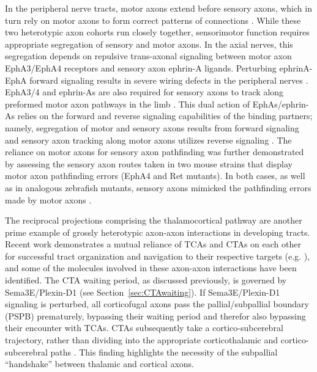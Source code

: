 In the peripheral nerve tracts, motor axons extend before sensory axons, which in turn rely on motor axons to form correct patterns of connections \cite{wang2013axons}.
While these two heterotypic axon cohorts run closely together, sensorimotor function requires appropriate segregation of sensory and motor axons.
In the axial nerves, this segregation depends on repulsive trans-axonal signaling between motor axon EphA3/EphA4 receptors and sensory axon ephrin-A ligands.
Perturbing ephrinA-EphA forward signaling results in severe wiring defects in the peripheral nerves \cite{gallarda2008segregation}.
EphA3/4 and ephrin-As are also required for sensory axons to track along preformed motor axon pathways in the limb \cite{wang2011anatomical}.
This dual action of EphAs/ephrin-As relies on the forward and reverse signaling capabilities of the binding partners; namely, segregation of motor and sensory axons results from forward signaling and sensory axon tracking along motor axons utilizes reverse signaling \cite{wang2011anatomical}.
The reliance on motor axons for sensory axon pathfinding was further demonstrated by assessing the sensory axon routes taken in two mouse strains that display motor axon pathfinding errors (EphA4 and Ret mutants).
In both cases, as well as in analogous zebrafish mutants, sensory axons mimicked the pathfinding errors made by motor axons \cite{wang2014conserved}.

The reciprocal projections comprising the thalamocortical pathway are another prime example of grossly heterotypic axon-axon interactions in developing tracts.
Recent work demonstrates a mutual reliance of TCAs and CTAs on each other for successful tract organization and navigation to their respective targets (e.g. ), and some of the molecules involved in these axon-axon interactions have been identified.
The CTA waiting period, as discussed previously, is governed by Sema3E/Plexin-D1 (see Section~\ref{sec:CTAwaiting}).
If Sema3E/Plexin-D1 signaling is perturbed, all corticofugal axons pass the pallial/subpallial boundary (PSPB) prematurely, bypassing their waiting period and therefor also bypassing their encounter with TCAs.
CTAs subsequently take a cortico-subcerebral trajectory, rather than dividing into the appropriate corticothalamic and cortico-subcerebral paths \cite{deck2013pathfinding}.
This finding highlights the necessity of the subpallial ``handshake'' between thalamic and cortical axons.

